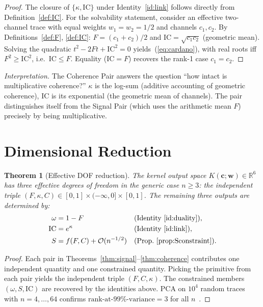 \documentclass[
  aps,
  prd,
  twocolumn,
  superscriptaddress,
  nofootinbib,
  floatfix
]{revtex4-2}
\newtheorem{theorem}{Theorem}
\newcommand{\tvec}{\mathbf{c}}
\newcommand{\wvec}{\mathbf{w}}
\newcommand{\IC}{\mathrm{IC}}
\newcommand{\Real}{\mathbb{R}}
\begin{document}
\begin{proof}
The closure of $\{\kappa,\IC\}$ under Identity~\ref{id:link}
follows directly from Definition~\ref{def:IC}.  For the
solvability statement, consider an effective two-channel trace
with equal weights $w_1=w_2=1/2$ and channels $c_1,c_2$.  By
Definitions~\ref{def:F}, \ref{def:IC}: $F=(c_1+c_2)/2$ and
$\IC = \sqrt{c_1 c_2}$ (geometric mean).  Solving the quadratic
$t^2 - 2F t + \IC^2 = 0$ yields~(\ref{eq:cardano}), with real
roots iff $F^2 \geq \IC^2$, i.e.\ $\IC\leq F$.  Equality
($\IC = F$) recovers the rank-1 case $c_1=c_2$.
\end{proof}

\emph{Interpretation.}  The Coherence Pair answers the question
``how intact is multiplicative coherence?''  $\kappa$ is the
log-sum (additive accounting of geometric coherence), $\IC$ is
its exponential (the geometric mean of channels).  The pair
distinguishes itself from the Signal Pair (which uses the
arithmetic mean $F$) precisely by being multiplicative.

\section{Dimensional Reduction}\label{sec:dof}

\begin{theorem}[Effective DOF reduction]\label{thm:dof}
The kernel output space $K(\tvec;\wvec)\in\Real^6$ has
\emph{three} effective degrees of freedom in the generic case
$n\ge 3$: the independent triple
$(F,\kappa,C)\in[0,1]\times(-\infty,0]\times[0,1]$.  The
remaining three outputs are determined by:
\begin{align}
  \omega &= 1 - F &&\text{(Identity~\ref{id:duality})},\\
  \IC    &= e^{\kappa} &&\text{(Identity~\ref{id:link})},\\
  S      &= f(F,C) + \mathcal{O}(n^{-1/2}) &&\text{(Prop.~\ref{prop:Sconstraint})}.
\end{align}
\end{theorem}

\begin{proof}
Each pair in Theorems~\ref{thm:signal}--\ref{thm:coherence}
contributes one independent quantity and one constrained
quantity.  Picking the primitive from each pair yields the
independent triple $(F,C,\kappa)$.  The constrained members
$(\omega,S,\IC)$ are recovered by the identities above.  PCA on
$10^4$ random traces with $n=4,\dots,64$ confirms
$\mathrm{rank}\text{-at-99\%-variance}=3$ for all
$n$~\cite{paulus2026umcpcasepack}.
\end{proof}
\end{document}
